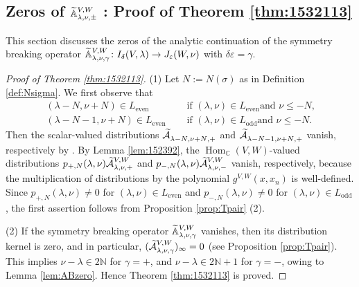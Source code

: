 \subsection{Zeros of ${\widetilde{\mathbb{A}}}_{{\lambda},{\nu},{\pm}}^{{V,W}}$ : Proof of Theorem \ref{thm:1532113}}
\label{subsec:1532113}
This section discusses the zeros
 of the analytic continuation of the symmetry breaking operator
$
   {\widetilde{\mathbb{A}}}_{{\lambda},{\nu},{\gamma}}^{{V,W}}
   \colon
   I_{\delta}(V,\lambda) \to J_{\varepsilon}(W,\nu)  
$
 with $\delta \varepsilon =\gamma$.  
\begin{proof}
[Proof of Theorem \ref{thm:1532113}]
(1)\enspace
Let 
$
N:=N(\sigma)
$
 as in Definition \ref{def:Nsigma}.  
We first observe that 
\begin{align*}
(\lambda-N, \nu+N) \in L_{\operatorname{even}}\quad
&
\text{ if $(\lambda, \nu) \in L_{\operatorname{even}}$
 and $\nu \le -N$,}
\\
(\lambda-N-1, \nu+N) \in L_{\operatorname{even}}\quad
&
\text{ if $(\lambda, \nu) \in L_{\operatorname{odd}}$
 and $\nu \le -N$.}
\end{align*}
Then the scalar-valued distributions
 $\widetilde{{\mathcal{A}}}_{{\lambda-N},{\nu+N},{+}}^{{}}$
 and $\widetilde{{\mathcal{A}}}_{{\lambda-N-1},{\nu+N},{+}}^{{}}$
 vanish, 
 respectively
 by \cite[Thm.~8.1]{sbon}.  
By Lemma \ref{lem:152392}, 
 the $\operatorname{Hom}_{\mathbb{C}}(V,W)$-valued distributions
 $p_{+,N}(\lambda,\nu)\widetilde{{\mathcal{A}}}_{{\lambda},{\nu},{+}}^{{V,W}}$
 and $p_{-,N}(\lambda,\nu)\widetilde{{\mathcal{A}}}_{{\lambda},{\nu},{-}}^{{V,W}}$ vanish, 
respectively,
 because the multiplication of distributions
 by the polynomial $g^{V,W}(x,x_n)$
 is well-defined.  
Since $p_{+,N}(\lambda,\nu) \ne 0$
 for 
$(\lambda,\nu) \in L_{\operatorname{even}}$
 and $p_{-,N}(\lambda,\nu) \ne 0$
 for 
$(\lambda,\nu) \in L_{\operatorname{odd}}$, 
 the first assertion follows from 
 Proposition \ref{prop:Tpair} (2).  
\par\noindent
(2)\enspace
If the symmetry breaking operator ${\widetilde{\mathbb{A}}}_{{\lambda},{\nu},{\gamma}}^{{V,W}}$ vanishes, 
 then its distribution kernel is zero, 
 and in particular,
 $(\widetilde{{\mathcal{A}}}_{{\lambda},{\nu},{\gamma}}^{{V,W}})_{\infty}=0$
 (see Proposition \ref{prop:Tpair}).  
This implies $\nu-\lambda \in 2{\mathbb{N}}$
 for $\gamma=+$, 
 and $\nu-\lambda \in 2 {\mathbb{N}}+1$
 for $\gamma=-$, 
 owing to Lemma \ref{lem:ABzero}. 
Hence Theorem \ref{thm:1532113} is proved.   
\end{proof}

